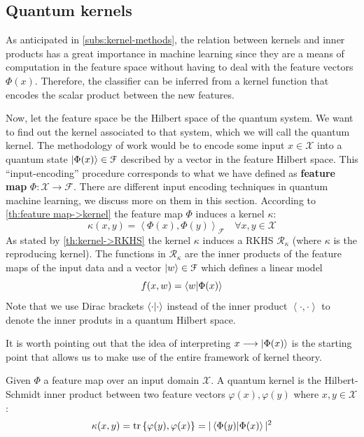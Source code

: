 
\subsection{Quantum kernels}

As anticipated in \autoref{subs:kernel-methods}, the relation between kernels and inner products has a great importance in machine learning since they are a means of computation in the feature space without having to deal with the feature vectors $\Phi(x)$. Therefore, the classifier can be inferred from a kernel function that encodes the scalar product between the new features.

Now, let the feature space be the Hilbert space of the quantum system. We want to find out the kernel associated to that system, which we will call the quantum kernel. The methodology of work would be to encode some input $x \in  \mathcal{X}$ into a quantum state $\ket{\Phi(x)} \in \mathcal{F}$ described by a vector in the feature Hilbert space. This ``input-encoding'' procedure corresponds to what we have defined as \textbf{feature map} $\Phi: \mathcal{X} \longrightarrow \mathcal{F}$. There are different input encoding techniques in quantum machine learning, we discuss more on them in this section. According to \autoref{th:feature map->kernel} the feature map $\Phi$ induces a kernel $\kappa$:
$$ \kappa(x,y)=\left< \Phi(x), \Phi(y) \right>_{\mathcal{F}} \quad \forall x,y \in \mathcal{X}$$
As stated by \autoref{th:kernel->RKHS} the kernel $\kappa$ induces a RKHS $\mathcal{R}_{\kappa}$ (where $\kappa$ is the reproducing kernel). The functions in $\mathcal{R}_{\kappa}$ are the inner products of the feature maps of the input data and a vector $\ket{w} \in \mathcal{F}$ which defines a linear model $$ f(x, w) = \braket{w | \Phi(x)} $$
Note that we use Dirac brackets $\braket{\cdot | \cdot}$ instead of the inner product $\left< \cdot , \cdot \right>$ to denote the inner produts in a quantum Hilbert space.

It is worth pointing out that the idea of interpreting $ x \longrightarrow \ket{\Phi(x)}$ is the starting point that allows us to make use of the entire framework of kernel theory. 

\begin{definicion}
    Given $\Phi$ a feature map over an input domain $\mathcal{X}$. A quantum kernel is the Hilbert-Schmidt inner product between two feature vectors $\varphi(x), \varphi(y)$ where $x,y \in \mathcal{X}$:
    \begin{equation}
        \kappa(x,y) = \mathrm{tr} \left\lbrace \varphi(y), \varphi(x) \right\rbrace = |\braket{\Phi(y)|\Phi(x)}|^2
    \end{equation}
\end{definicion}


